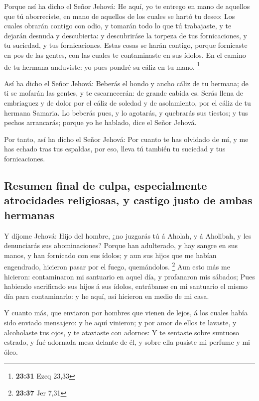  Porque así ha dicho el Señor Jehová: He aquí, yo te
entrego en mano de aquellos que tú aborreciste, en mano de aquellos de
los cuales se hartó tu deseo:  Los cuales obrarán contigo
con odio, y tomarán todo lo que tú trabajaste, y te dejarán desnuda y
descubierta: y descubriráse la torpeza de tus fornicaciones, y tu
suciedad, y tus fornicaciones.  Estas cosas se harán
contigo, porque fornicaste en pos de las gentes, con las cuales te
contaminaste en sus ídolos.  En el camino de tu hermana
anduviste: yo pues pondré su cáliz en tu mano. \footnote{\textbf{23:31}
  Ezeq 23,33}

 Así ha dicho el Señor Jehová: Beberás el hondo y ancho
cáliz de tu hermana; de ti se mofarán las gentes, y te escarnecerán: de
grande cabida es.  Serás llena de embriaguez y de dolor por
el cáliz de soledad y de asolamiento, por el cáliz de tu hermana
Samaria.  Lo beberás pues, y lo agotarás, y quebrarás sus
tiestos; y tus pechos arrancarás; porque yo he hablado, dice el Señor
Jehová.

 Por tanto, así ha dicho el Señor Jehová: Por cuanto te has
olvidado de mí, y me has echado tras tus espaldas, por eso, lleva tú
también tu suciedad y tus fornicaciones.

\hypertarget{resumen-final-de-culpa-especialmente-atrocidades-religiosas-y-castigo-justo-de-ambas-hermanas}{%
\subsection{Resumen final de culpa, especialmente atrocidades
religiosas, y castigo justo de ambas
hermanas}\label{resumen-final-de-culpa-especialmente-atrocidades-religiosas-y-castigo-justo-de-ambas-hermanas}}

 Y díjome Jehová: Hijo del hombre, ¿no juzgarás tú á
Aholah, y á Aholibah, y les denunciarás sus abominaciones? 
Porque han adulterado, y hay sangre en sus manos, y han fornicado con
sus ídolos; y aun sus hijos que me habían engendrado, hicieron pasar por
el fuego, quemándolos. \footnote{\textbf{23:37} Jer 7,31} 
Aun esto más me hicieron: contaminaron mi santuario en aquel día, y
profanaron mis sábados;  Pues habiendo sacrificado sus
hijos á sus ídolos, entrábanse en mi santuario el mismo día para
contaminarlo: y he aquí, así hicieron en medio de mi casa.

 Y cuanto más, que enviaron por hombres que vienen de
lejos, á los cuales había sido enviado mensajero: y he aquí vinieron; y
por amor de ellos te lavaste, y alcoholaste tus ojos, y te ataviaste con
adornos:  Y te sentaste sobre suntuoso estrado, y fué
adornada mesa delante de él, y sobre ella pusiste mi perfume y mi óleo.

